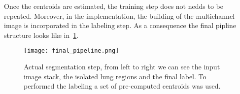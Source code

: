 \documentclass{standalone}
\begin{document}
	Once the centroids are estimated, the training step does not nedds to be repeated. Moreover, in the implementation, the building of the multichannel image is incorporated in the labeling step. As a consequence the final pipline structure looks like in \figurename\,\ref{fig:FinalPipeline}.
	
	\begin{figure}[h!]
		\centering
		\texttt{[image: final\_pipeline.png]}
		\caption{Actual segmentation step, from left to right we can see the input image stack, the isolated lung regions and the final label. To performed the labeling a set of pre-computed centroids was used.}\label{fig:FinalPipeline}
	\end{figure}
	
	
	
	
	
	
	
	
\end{document}
